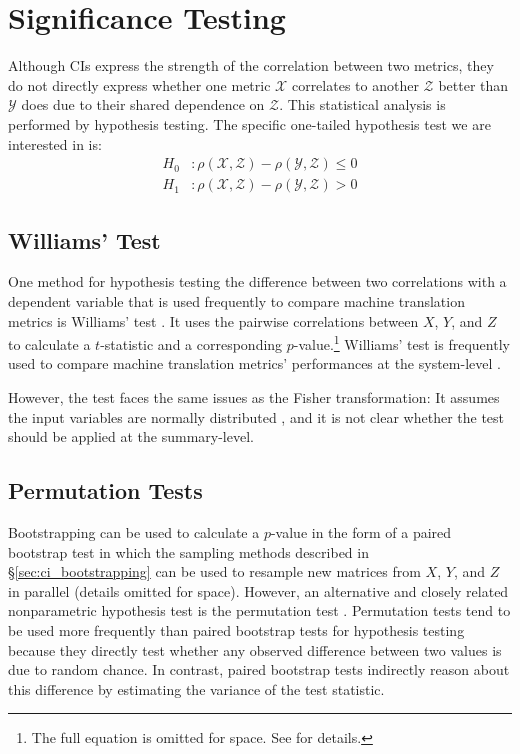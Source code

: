 \section{Significance Testing}
\label{sec:hypo}
Although CIs express the strength of the correlation between two metrics, they do not directly express whether one metric $\mathcal{X}$ correlates to another $\mathcal{Z}$ better than $\mathcal{Y}$ does due to their shared dependence on $\mathcal{Z}$.
This statistical analysis is performed by hypothesis testing.
The specific one-tailed hypothesis test we are interested in is:
\begin{align*}
    H_0 &: \rho(\mathcal{X}, \mathcal{Z}) - \rho(\mathcal{Y}, \mathcal{Z}) \leq 0 \\
    H_1 &: \rho(\mathcal{X}, \mathcal{Z}) - \rho(\mathcal{Y}, \mathcal{Z}) > 0
\end{align*}

\subsection{Williams' Test}
\label{sec:williams}
One method for hypothesis testing the difference between two correlations with a dependent variable that is used frequently to compare machine translation metrics is Williams' test \citep{Williams59}.
It uses the pairwise correlations between $X$, $Y$, and $Z$ to calculate a $t$-statistic and a corresponding $p$-value.\footnote{
The full equation is omitted for space.
See \citet{GrahamBa14} for details.
} Williams' test is frequently used to compare machine translation metrics' performances at the system-level \citep[among others]{MWFMB20}.


However, the test faces the same issues as the Fisher transformation: It assumes the input variables are normally distributed \citep{DunnCl71}, and it is not clear whether the test should be applied at the summary-level.

\subsection{Permutation Tests}
\label{sec:hypo_permutation}
Bootstrapping can be used to calculate a $p$-value in the form of a paired bootstrap test in which the sampling methods described in \S\ref{sec:ci_bootstrapping} can be used to resample new matrices from $X$, $Y$, and $Z$ in parallel (details omitted for space).
However, an alternative and closely related nonparametric hypothesis test is the permutation test \citep{Noreen89}.
Permutation tests tend to be used more frequently than paired bootstrap tests for hypothesis testing because they directly test whether any observed difference between two values is due to random chance.
In contrast, paired bootstrap tests indirectly reason about this difference by estimating the variance of the test statistic.



